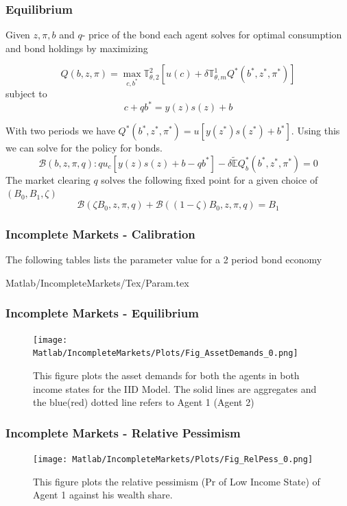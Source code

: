 \documentclass{beamer}
\begin{document}
\begin{frame}
\frametitle{Equilibrium}
Given $z,\pi,b$ and $q$- price of the bond each agent solves for optimal consumption and bond holdings by maximizing

\begin{equation}
Q(b,z,\pi)=\max_{c,b^*}{\mathbb{T}^2_{\theta,2}\left[u(c)+\delta\mathbb{T}^{1}_{\theta,m}Q^{*}(b^*,z^*,\pi^*)\right]}
\label{eq:HHProblemBond}
\end{equation}
subject to
\[c+qb^*=y(z)s(z)+b\]

With two periods we have $Q^*(b^*,z^*,\pi^*)=u[y(z^*)s(z^*)+b^*]$. Using this we can solve for the policy for bonds. 
\[\mathcal{B}(b,z,\pi,q) : q u_{c}[y(z)s(z)+b-qb^*]-\delta\tilde{\mathbb{E}}Q_{b}^{*}(b^*,z^*,\pi^*)=0\]
The market clearing $q$ solves the following fixed point for a given choice of $(B_0,B_1,\zeta)$
\begin{equation}
\mathcal{B}(\zeta B_0,z,\pi,q)+\mathcal{B}((1-\zeta) B_0,z,\pi,q)=B_1
\label{eq:BondPrice}
\end{equation}
\end{frame}

\begin{frame}
\frametitle{Incomplete Markets - Calibration}
\scriptsize{The following tables lists the parameter value for a 2 period bond
economy}

{Matlab/IncompleteMarkets/Tex/Param.tex}

\end{frame}



\begin{frame}
\frametitle{Incomplete Markets - Equilibrium}
\begin{figure}[htbp]
\centering
	  \texttt{[image: Matlab/IncompleteMarkets/Plots/Fig\_AssetDemands\_0.png]}

	\caption{This figure plots the asset demands for both the agents in
          both income states for the IID  Model. The  solid lines are
          aggregates and the blue(red) dotted line refers to Agent 1
          (Agent 2)}
	\label{fig:bstar_0}
\end{figure} 

\end{frame}


\begin{frame}
\frametitle{Incomplete Markets - Relative Pessimism}
\begin{figure}[htbp]
\centering
	  \texttt{[image: Matlab/IncompleteMarkets/Plots/Fig\_RelPess\_0.png]}

	\caption{This figure plots the relative pessimism (Pr of Low
          Income State) of Agent 1
          against his wealth share.}
	\label{fig:RelShare_0}
\end{figure} 

\end{frame}
\end{document}
